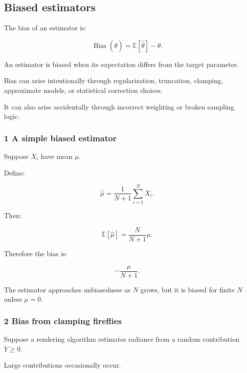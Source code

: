 \subsection{Biased estimators}\label{02-foundations-ii-ch030-biased-estimators}

\hypertarget{02-foundations-ii-ch030-biased-estimators}{}

The bias of an estimator is:

\[
 \boxed{ \operatorname{Bias}(\widehat\theta) = \mathbb E[\widehat\theta]-\theta }.
\]

An estimator is biased when its expectation differs from the target parameter.

Bias can arise intentionally through regularization, truncation, clamping, approximate models, or statistical correction choices.

It can also arise accidentally through incorrect weighting or broken sampling logic.

\subsubsection{1 A simple biased estimator}\label{02-foundations-ii-ch030-a-simple-biased-estimator}

\hypertarget{02-foundations-ii-ch030-a-simple-biased-estimator}{}

Suppose \(X_i\) have mean \(\mu\).

Define:

\[
 \widehat\mu= \frac1{N+1}\sum_{i=1}^NX_i.
\]

Then:

\[
 \mathbb E[\widehat\mu] = \frac{N}{N+1}\mu.
\]

Therefore the bias is:

\[
 \boxed{ -\frac{\mu}{N+1} }.
\]

The estimator approaches unbiasedness as \(N\) grows, but it is biased for finite \(N\) unless \(\mu=0\).

\subsubsection{2 Bias from clamping fireflies}\label{02-foundations-ii-ch030-bias-from-clamping-fireflies}

\hypertarget{02-foundations-ii-ch030-bias-from-clamping-fireflies}{}

Suppose a rendering algorithm estimates radiance from a random contribution \(Y\ge0\).

Large contributions occasionally occur.

